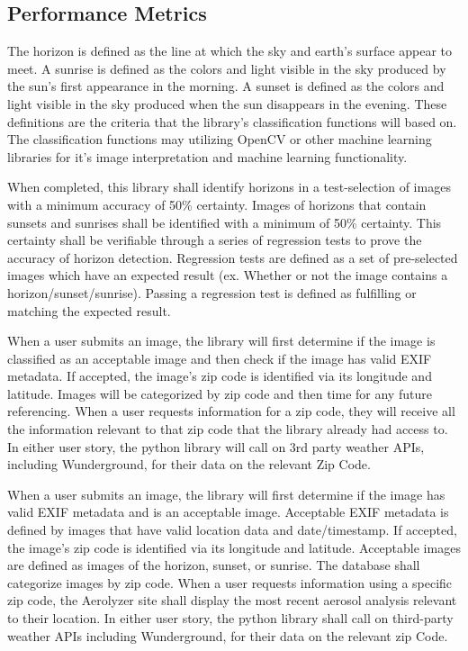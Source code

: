 \documentclass[letterpaper,10pt,draftclsnofoot,onecolumn]{IEEEtran}
\begin{document}
\begin{flushleft}
\section{Performance Metrics} 
The horizon is defined as the line at which the sky and earth's surface appear to meet. A sunrise is defined as the colors and light visible in the sky produced by the sun's first appearance in the morning. A sunset is defined as the colors and light visible in the sky produced when the sun disappears in the evening. These definitions are the criteria that the library’s classification functions will based on. The classification functions may utilizing OpenCV or other machine learning libraries for it’s image interpretation and machine learning functionality.
\par
When completed, this library shall identify horizons in a test-selection of images with a minimum accuracy of 50\% certainty. Images of horizons that contain sunsets and sunrises shall be identified with a minimum of 50\% certainty. This certainty shall be verifiable through a series of regression tests to prove the accuracy of horizon detection. Regression tests are defined as a set of pre-selected images which have an expected result (ex. Whether or not the image contains a horizon/sunset/sunrise). Passing a regression test is defined as fulfilling or matching the expected result. 
\par
When a user submits an image, the library will first determine if the image is classified as an acceptable image and then check if the image has valid EXIF metadata. If accepted, the image's zip code is identified via its longitude and latitude. Images will be categorized by zip code and then time for any future referencing. When a user requests information for a zip code, they will receive all the information relevant to that zip code that the library already had access to. In either user story, the python library will call on 3rd party weather APIs, including Wunderground, for their data on the relevant Zip Code.
\par
When a user submits an image, the library will first determine if the image has valid EXIF metadata and is an acceptable image. Acceptable EXIF metadata is defined by images that have valid location data and date/timestamp.  If accepted, the image's zip code is identified via its longitude and latitude. Acceptable images are defined as images of the horizon, sunset, or sunrise. The database shall categorize images by zip code. When a user requests information using a specific zip code, the Aerolyzer site shall display the most recent aerosol analysis relevant to their location. In either user story, the python library shall call on third-party weather APIs including Wunderground, for their data on the relevant zip Code.

\end{flushleft}
\end{document}
